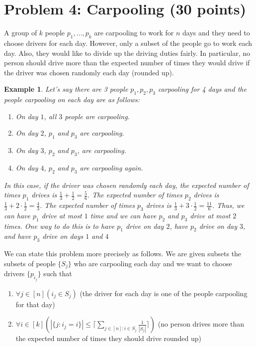 \documentclass[12pt]{article}
\newtheorem{example}[theorem]{Example}
\begin{document}
\section*{Problem 4: Carpooling (30 points)}
A group of $k$ people $p_1,\ldots,p_k$ are carpooling to work for $n$ days and they need to choose drivers for each day. However, only a subset of the people go to work each day. Also, they would like to divide up the driving duties fairly. In particular, no person should drive more than the expected number of times they would drive if the driver was chosen randomly each day (rounded up).
\begin{example}
Let's say there are 3 people $p_1,p_2,p_3$ carpooling for 4 days and the people carpooling on each day are as follows:
\begin{enumerate}
\item On day $1$, all $3$ people are carpooling.
\item On day $2$, $p_1$ and $p_3$ are carpooling.
\item On day $3$, $p_2$ and $p_3$, are carpooling.
\item On day $4$, $p_2$ and $p_3$ are carpooling again.
\end{enumerate}
In this case, if the driver was chosen randomly each day, the expected number of times $p_1$ drives is $\frac{1}{3} + \frac{1}{2} = \frac{5}{6}$. The expected number of times $p_2$ drives is $\frac{1}{3} + 2\cdot\frac{1}{2} = \frac{4}{3}$. The expected number of times $p_3$ drives is $\frac{1}{3} + 3\cdot\frac{1}{2} = \frac{11}{6}$. Thus, we can have $p_1$ drive at most $1$ time and we can have $p_2$ and $p_3$ drive at most $2$ times. One way to do this is to have $p_1$ drive on day $2$, have $p_2$ drive on day $3$, and have $p_3$ drive on days $1$ and $4$
\end{example}
We can state this problem more precisely as follows. We are given subsets the subsets of people $\{S_j\}$ who are carpooling each day and we want to choose drivers $\{p_{i_j}\}$ such that 
\begin{enumerate}
\item $\forall j \in [n] (i_j \in S_j)$ (the driver for each day is one of the people carpooling for that day)
\item $\forall i \in [k]\left(|\{j: i_j = i\}| \leq \lceil\sum_{j \in [n]:i \in S_j}{\frac{1}{|S_j|}}\rceil\right)$ (no person drives more than the expected number of times they should drive rounded up)
\end{enumerate}
\end{document}
